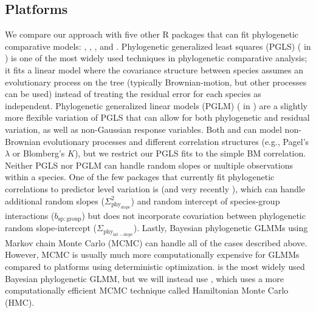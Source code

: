 \documentclass[12pt]{article}
\begin{document}
\subsection*{Platforms}

We compare our approach with five other R packages that can fit phylogenetic comparative models:  \citep{pinheiro2014r},  \citep{ho2014phylolm},  \citep{pearse2015pez}, and  \citep{burkner2018brms}.
Phylogenetic generalized least squares (PGLS) ( in ) is one of the most widely used techniques in phylogenetic comparative analysis; it fits a linear model where the covariance structure between species assumes an evolutionary process on the tree (typically Brownian-motion, but other processes can be used) instead of treating the residual error for each species as independent.
Phylogenetic generalized linear models (PGLM) ( in ) are a slightly more flexible variation of PGLS that can allow for both phylogenetic and residual variation, as well as non-Gaussian response variables.
Both  and  can model non-Brownian evolutionary processes and different correlation structures (e.g., Pagel's $\lambda$ or Blomberg's $K$), but we restrict our PGLS fits to the simple BM correlation. 
Neither PGLS nor PGLM can handle random slopes or multiple observations within a species.
One of the few packages that currently fit phylogenetic correlations to predictor level variation is  (and very recently ), which can handle additional random slopes ($\Sigma^2_{\mathrm{phy_{slope}}}$) and random intercept of species-group interactions ($b_{\mathrm{sp:group}}$) but does not incorporate covariation between phylogenetic random slope-intercept ($\Sigma_{\mathrm{phy_{int-slope}}}$).
Lastly, Bayesian phylogenetic GLMMs using Markov chain Monte Carlo (MCMC) can handle all of the cases described above. 
However, MCMC is usually much more computationally expensive for GLMMs compared to platforms using deterministic optimization.
 \citep{hadfield2010general} is the most widely used Bayesian phylogenetic GLMM, but we will instead use , which uses a more computationally efficient MCMC technique called Hamiltonian Monte Carlo (HMC)\citep{duane1987hybrid}.
 
\end{document}
